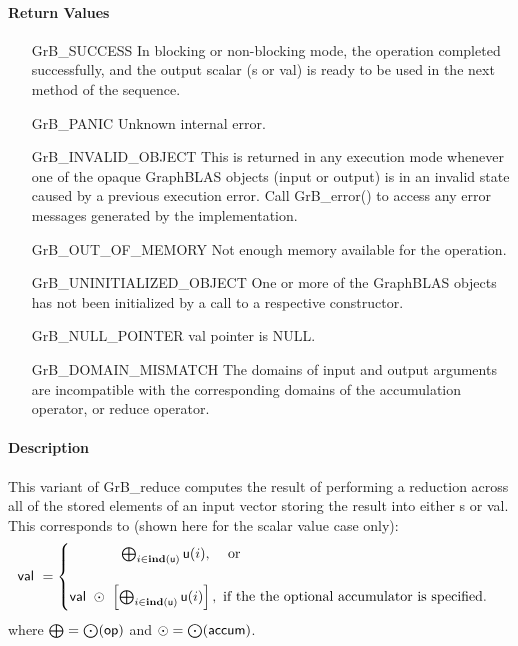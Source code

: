 \paragraph{Return Values}

\begin{itemize}[leftmargin=2.1in]
    \item[{\sf GrB\_SUCCESS}]         In blocking or non-blocking mode, 
    the operation completed successfully, and the
    output scalar ({\sf s} or {\sf val}) is ready to be used in the next method of 
    the sequence.

    \item[{\sf GrB\_PANIC}]           Unknown internal error.

    \item[{\sf GrB\_INVALID\_OBJECT}] This is returned in any execution mode 
    whenever one of the opaque GraphBLAS objects (input or output) is in an invalid 
    state caused by a previous execution error.  Call {\sf GrB\_error()} to access 
    any error messages generated by the implementation.

    \item[{\sf GrB\_OUT\_OF\_MEMORY}] Not enough memory available for the operation.

    \item[{\sf GrB\_UNINITIALIZED\_OBJECT}] One or more of the GraphBLAS objects 
    has not been initialized by a call to a respective constructor.

    \item[{\sf GrB\_NULL\_POINTER}]  {\sf val} pointer is {\sf NULL}.
    
    \item[{\sf GrB\_DOMAIN\_MISMATCH}]    The domains of input and output arguments are
    incompatible with the corresponding domains of the accumulation operator, 
    or reduce operator.
\end{itemize}

\paragraph{Description}

This variant of {\sf GrB\_reduce} computes the result of performing a reduction
across all of the stored elements of an input vector storing the result into either
{\sf s} or {\sf val}.  This corresponds to (shown here for the scalar value case only):
\begin{equation*}
{\sf val} ~ = 
  \begin{cases}
     \hspace{3.7em} \bigoplus_{i \in \mathbf{ind}({\sf u})} {\sf u}(i) \text{,~~~ or} \\& \\
    {\sf val} ~\odot~ \left[ \bigoplus_{i \in \mathbf{ind}({\sf u})} {\sf u}(i)\right], \text{~if the the optional accumulator is specified.} 
  \end{cases}
\end{equation*}
where $\bigoplus = \bigodot({\sf op})$ and $\odot = \bigodot({\sf accum})$.  

